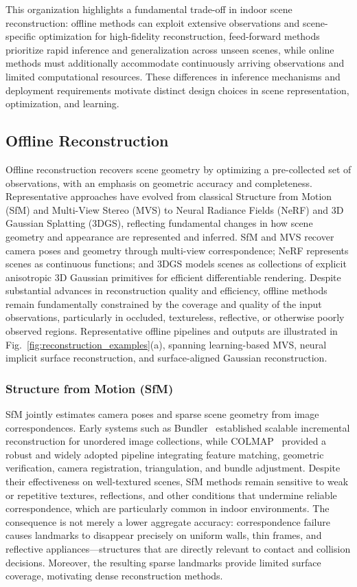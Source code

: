 \documentclass{SCIS2026}
\begin{document}
This organization highlights a fundamental trade-off in indoor scene reconstruction: offline methods can exploit extensive observations and scene-specific optimization for high-fidelity reconstruction, feed-forward methods prioritize rapid inference and generalization across unseen scenes, while online methods must additionally accommodate continuously arriving observations and limited computational resources. These differences in inference mechanisms and deployment requirements motivate distinct design choices in scene representation, optimization, and learning.

\subsection{Offline Reconstruction}
Offline reconstruction recovers scene geometry by optimizing a pre-collected set of observations, with an emphasis on geometric accuracy and completeness. Representative approaches have evolved from classical Structure from Motion (SfM) and Multi-View Stereo (MVS) to Neural Radiance Fields (NeRF) and 3D Gaussian Splatting (3DGS), reflecting fundamental changes in how scene geometry and appearance are represented and inferred. SfM and MVS recover camera poses and geometry through multi-view correspondence; NeRF represents scenes as continuous functions; and 3DGS models scenes as collections of explicit anisotropic 3D Gaussian primitives for efficient differentiable rendering. Despite substantial advances in reconstruction quality and efficiency, offline methods remain fundamentally constrained by the coverage and quality of the input observations, particularly in occluded, textureless, reflective, or otherwise poorly observed regions. Representative offline pipelines and outputs are illustrated in Fig.~\ref{fig:reconstruction_examples}(a), spanning learning-based MVS, neural implicit surface reconstruction, and surface-aligned Gaussian reconstruction.

\subsubsection{Structure from Motion (SfM)}
SfM jointly estimates camera poses and sparse scene geometry from image correspondences. Early systems such as Bundler~\cite{snavely2006photo} established scalable incremental reconstruction for unordered image collections, while COLMAP~\cite{schonberger2016structure} provided a robust and widely adopted pipeline integrating feature matching, geometric verification, camera registration, triangulation, and bundle adjustment. Despite their effectiveness on well-textured scenes, SfM methods remain sensitive to weak or repetitive textures, reflections, and other conditions that undermine reliable correspondence, which are particularly common in indoor environments. The consequence is not merely a lower aggregate accuracy: correspondence failure causes landmarks to disappear precisely on uniform walls, thin frames, and reflective appliances---structures that are directly relevant to contact and collision decisions. Moreover, the resulting sparse landmarks provide limited surface coverage, motivating dense reconstruction methods.
\end{document}
